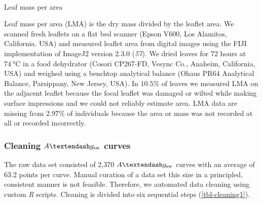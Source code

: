 \documentclass[
  letterpaper,
  DIV=11,
  numbers=noendperiod]{scrartcl}
\makeatletter
\let\oldparagraph\paragraph
\renewcommand{\paragraph}{
    \@ifstar
      \xxxParagraphStar
      \xxxParagraphNoStar
  }
\newcommand{\xxxParagraphStar}[1]{\oldparagraph*{#1}\mbox{}}
\newcommand{\xxxParagraphNoStar}[1]{\oldparagraph{#1}\mbox{}}
\newcommand{\agcurve}{$A \textendash g_\text{sw}$}
\makeatother
\begin{document}
\paragraph{Leaf mass per area}\label{leaf-mass-per-area}

Leaf mass per area (LMA) is the dry mass divided by the leaflet area. We
scanned fresh leaflets on a flat bed scanner (Epson V600, Los Alamitos,
California. USA) and measured leaflet area from digital images using the
FIJI implementation of ImageJ2 version 2.3.0 (\emph{57}). We dried
leaves for 72 hours at \(\qty{74}{\degreeCelsius}\) in a food dehydrator
(Cosori CP267-FD, Vesync Co., Anaheim, California, USA) and weighed
using a benchtop analytical balance (Ohaus PR64 Analytical Balance,
Parsippany, New Jersey, USA). In \(10.5\%\) of leaves we measured LMA on
the adjacent leaflet because the focal leaflet was damaged or wilted
while making surface impressions and we could not reliably estimate
area. LMA data are missing from \(2.97\%\) of individuals because the
area or mass was not recorded at all or recorded incorrectly.

\subsubsection{\texorpdfstring{Cleaning \agcurve{}
curves}{Cleaning  curves}}\label{cleaning-curves}

The raw data set consisted of 2,370 \agcurve{} curves with an average of
63.2 points per curve. Manual curation of a data set this size in a
principled, consistent manner is not feasible. Therefore, we automated
data cleaning using custom \emph{R} scripts. Cleaning is divided into
six sequential steps (\autoref{tbl-cleaning1}).
\end{document}
